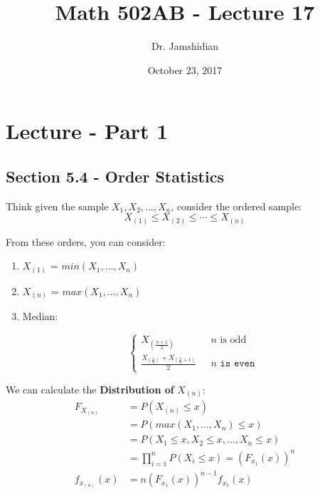 \documentclass{article}
\title{Math 502AB - Lecture 17}
\author{Dr. Jamshidian}
\date{October 23, 2017}
\begin{document}
\maketitle

\section{Lecture - Part 1}

\subsection{Section 5.4 - Order Statistics}

Think given the sample $X_1, X_2,...,X_n$, consider the ordered sample:
\begin{equation*}
    X_{(1)} \leq X_{(2)} \leq \cdots \leq X_{(n)}
\end{equation*}

\noindent From these orders, you can consider:

\begin{enumerate}
    \item $X_{(1)}$ = $min(X_1,...,X_n)$
    \item $X_{(n)}$ = $max(X_1,...,X_n)$
    \item Median: 
    
    \begin{equation*}
        \begin{cases}
            X_{\left(\frac{n+1}{2}\right)} & \text{ $n$ is odd}\\
            \frac{X_{\left(\frac{n}{2}\right)} + X_{\left(\frac{n}{2} + 1\right)}}{2} & \texttt{ $n$ is even}
        \end{cases}
    \end{equation*}
\end{enumerate}

We can calculate the \textbf{Distribution of} $X_{(n)}$:
\begin{equation*}
    \begin{split}
        F_{X_{(n)}} &= P\left(X_{(n)} \leq x \right)\\
                    &= P\left( max(X_1,...,X_n) \leq x \right)\\
                    &= P\left( X_1 \leq x, X_2 \leq x,...,X_n \leq x\right)\\
                    &= \prod_{i=1}^n P(X_i \leq x) = \left(F_{x_1}(x) \right)^n\\
        f_{x_{(n)}}(x) &= n \left(F_{x_1}(x) \right)^{n-1} f_{x_1}(x)
    \end{split}
\end{equation*}
\end{document}
